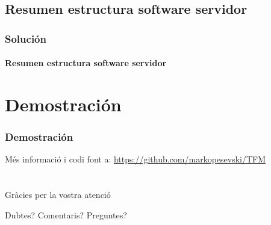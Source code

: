 \documentclass[compress]{beamer}
\begin{document}
	\subsection{Resumen estructura software servidor}
		\begin{frame}
			\frametitle{Soluci\'on}
			\framesubtitle{Resumen estructura software servidor}
				\begin{figure}
				\end{figure}
 		\end{frame}

\section{Demostraci\'on}
		\begin{frame}
			\frametitle{Demostraci\'on}
			\vfill
			M\'es informaci\'o i codi font a:
			\url{https://github.com/markopesevski/TFM}
			\vfill
 		\end{frame}


\section*{}
\begin{frame}[plain]
	\addtocounter{framenumber}{-1}

	\begin{center}
		{\Huge{Gr\`acies per la vostra atenci\'o}}
	\end{center}
	\begin{center}
		{\large{Dubtes? Comentaris? Preguntes?}}
	\end{center}
\end{frame}

\end{document}
